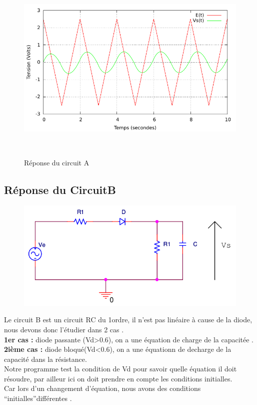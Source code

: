 \documentclass[a4paper,11pt]{article}
\begin{document}
\begin{figure}[h!]
\begin{minipage}[b]{0.5\linewidth}
   \end{minipage}
  \begin{minipage}[b]{0.5\linewidth}   
      \centering \includegraphics[scale=.68]{CAtriangle.pdf}
   \end{minipage}\\
 \caption{Réponse du circuit A}
\end{figure}

\newpage
  \subsection{Réponse du CircuitB}
  
\begin{figure}[H]
	 \begin{center}
	\includegraphics[scale=.5]{circuitB}
	\end{center}
      \end{figure}
   Le circuit B est un circuit RC du 1\ier ordre, il n'est pas linéaire à cause de la diode, nous devons donc l'étudier dans 2 cas .\\
   \textbf{1er cas :} diode passante (Vd>0.6), on a une équation de charge de la capacitée .\\
   \textbf{2ième cas :} diode bloqué(Vd<0.6), on a une équationn de decharge de la capacité dans la résistance.\\
   Notre programme test la condition de Vd pour savoir quelle équation il doit résoudre, par ailleur ici on doit prendre en compte les conditions initialles.\\
   Car lors d'un changement d'équation, nous avons des conditions ``initialles''différentes .\\
\end{document}
